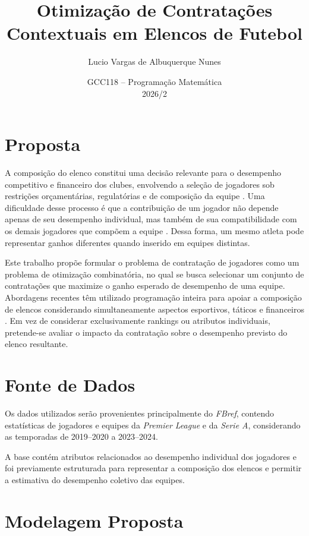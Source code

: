 \documentclass[12pt,a4paper]{article}
\title{\textbf{Otimização de Contratações Contextuais em Elencos de Futebol}}
\author{Lucio Vargas de Albuquerque Nunes}
\date{GCC118 -- Programação Matemática \\ 2026/2}
\begin{document}
\maketitle

\section*{Proposta}

A composição do elenco constitui uma decisão relevante para o desempenho competitivo e financeiro dos clubes, envolvendo a seleção de jogadores sob restrições orçamentárias, regulatórias e de composição da equipe \parencite{pantuso2017}. Uma dificuldade desse processo é que a contribuição de um jogador não depende apenas de seu desempenho individual, mas também de sua compatibilidade com os demais jogadores que compõem a equipe \parencite{jarvandi2013}. Dessa forma, um mesmo atleta pode representar ganhos diferentes quando inserido em equipes distintas.

Este trabalho propõe formular o problema de contratação de jogadores como um problema de otimização combinatória, no qual se busca selecionar um conjunto de contratações que maximize o ganho esperado de desempenho de uma equipe. Abordagens recentes têm utilizado programação inteira para apoiar a composição de elencos considerando simultaneamente aspectos esportivos, táticos e financeiros \parencite{dantas2025}. Em vez de considerar exclusivamente rankings ou atributos individuais, pretende-se avaliar o impacto da contratação sobre o desempenho previsto do elenco resultante.

\section*{Fonte de Dados}

Os dados utilizados serão provenientes principalmente do \textit{FBref}, contendo estatísticas de jogadores e equipes da \textit{Premier League} e da \textit{Serie A}, considerando as temporadas de 2019--2020 a 2023--2024.

A base contém atributos relacionados ao desempenho individual dos jogadores e foi previamente estruturada para representar a composição dos elencos e permitir a estimativa do desempenho coletivo das equipes.

\section*{Modelagem Proposta}
\end{document}

